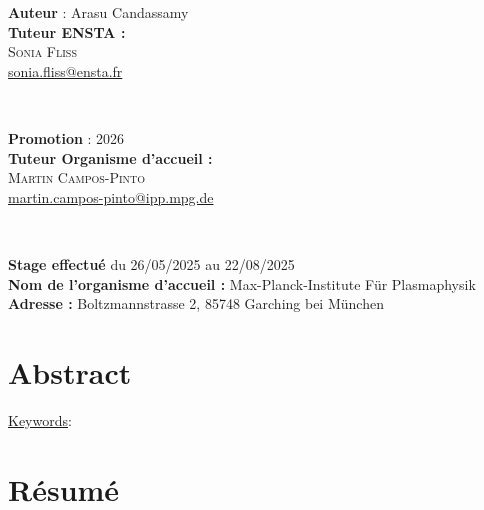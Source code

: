 \documentclass[a4paper,12pt,twoside]{report}
\begin{document}
\begin{minipage}[t]{0.5\textwidth}
	\begin{flushleft} 
    \textbf{Auteur} : Arasu Candassamy \\
    \vspace{1cm}
	\textbf{Tuteur ENSTA :}\\
	\textsc{Sonia Fliss}\\
	\href{mailto:sonia.fliss@ensta.fr}{sonia.fliss@ensta.fr}
	\end{flushleft}
\end{minipage}
~
\begin{minipage}[t]{0.4\textwidth}
	\begin{flushright} 
    \textbf{Promotion} : 2026 \\
    \vspace{1cm}
	\textbf{Tuteur Organisme d'accueil :}\\
	\textsc{Martin Campos-Pinto}\\
	\href{mailto:martin.campos-pinto@ipp.mpg.de}{martin.campos-pinto@ipp.mpg.de}\\
	\end{flushright}
\end{minipage} \\

\vspace{1cm}

\begin{center}
    \textbf{Stage effectué} du 26/05/2025 au 22/08/2025\\
\textbf{Nom de l’organisme d’accueil :} Max-Planck-Institute Für Plasmaphysik\\
\textbf{Adresse :} Boltzmannstrasse 2, 85748 Garching bei München
\end{center}


\newpage\null

\newpage
\section*{Abstract}

\lipsum[1-2]

\vspace{1cm}

\underline{Keywords}:

\vspace{1cm}

\section*{Résumé}
\end{document}

